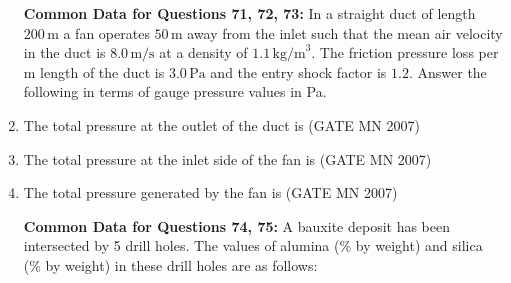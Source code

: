 \documentclass[journal]{IEEEtran}
\begin{document}
\begin{enumerate}
\textbf{Common Data for Questions 71, 72, 73:}  
In a straight duct of length $200 \, \text{m}$ a fan operates $50 \, \text{m}$ away from the inlet such that the mean air velocity in the duct is $8.0 \, \text{m/s}$ at a density of $1.1 \, \text{kg/m}^3$. The friction pressure loss per m length of the duct is $3.0 \, \text{Pa}$ and the entry shock factor is $1.2$. Answer the following in terms of gauge pressure values in Pa.

    \item The total pressure at the outlet of the duct is 
	    \hfill (GATE MN 2007)
	    \begin{enumerate}
    \end{enumerate}


    \item The total pressure at the inlet side of the fan is  
	    \hfill (GATE MN 2007)
    \begin{enumerate}
    \end{enumerate}

    \item The total pressure generated by the fan is  
	    \hfill (GATE MN 2007)
    \begin{enumerate}
    \end{enumerate}


\textbf{Common Data for Questions 74, 75:}  
A bauxite deposit has been intersected by 5 drill holes. The values of alumina (\% by weight) and silica (\% by weight) in these drill holes are as follows:


\end{enumerate}
\end{document}
